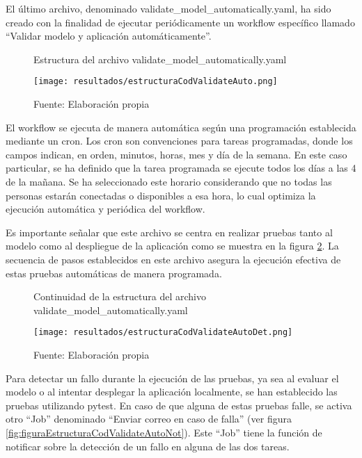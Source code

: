 El último archivo, denominado validate\_model\_automatically.yaml, ha sido creado con la finalidad de ejecutar periódicamente un workflow específico llamado ``Validar modelo y aplicación automáticamente''.


\newpage

\begin{figure}[h]
	\centering
	\caption{Estructura del archivo validate\_model\_automatically.yaml}
	\texttt{[image: resultados/estructuraCodValidateAuto.png]}
	\caption*{\footnotesize Fuente: Elaboración propia}
	\label{fig:figuraEstructuraCodValidateAuto}
\end{figure}

El workflow se ejecuta de manera automática según una programación establecida mediante un cron. Los cron son convenciones para tareas programadas, donde los campos indican, en orden, minutos, horas, mes y día de la semana. En este caso particular, se ha definido que la tarea programada se ejecute todos los días a las 4 de la mañana. Se ha seleccionado este horario considerando que no todas las personas estarán conectadas o disponibles a esa hora, lo cual optimiza la ejecución automática y periódica del workflow. \newline

Es importante señalar que este archivo se centra en realizar pruebas tanto al modelo como al despliegue de la aplicación como se muestra en la figura \ref{fig:figuraEstructuraCodValidateAutoDet}. La secuencia de pasos establecidos en este archivo asegura la ejecución efectiva de estas pruebas automáticas de manera programada.

\newpage

\begin{figure}[h]
	\centering
	\caption{Continuidad de la estructura del archivo validate\_model\_automatically.yaml}
	\texttt{[image: resultados/estructuraCodValidateAutoDet.png]}
	\caption*{\footnotesize Fuente: Elaboración propia}
	\label{fig:figuraEstructuraCodValidateAutoDet}
\end{figure}

Para detectar un fallo durante la ejecución de las pruebas, ya sea al evaluar el modelo o al intentar desplegar la aplicación localmente, se han establecido las pruebas utilizando pytest. En caso de que alguna de estas pruebas falle, se activa otro ``Job'' denominado ``Enviar correo en caso de falla'' (ver figura \ref{fig:figuraEstructuraCodValidateAutoNot}). Este ``Job'' tiene la función de notificar sobre la detección de un fallo en alguna de las dos tareas.

